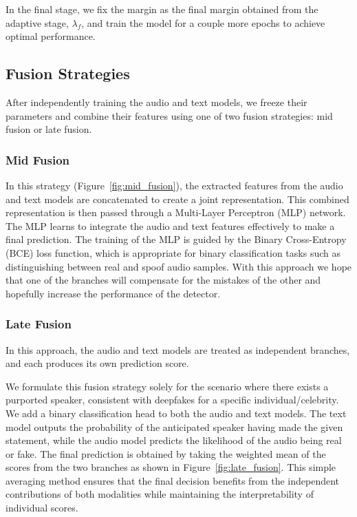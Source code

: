 \documentclass{Interspeech}
\begin{document}
In the final stage, we fix the margin as the final margin obtained from the
adaptive stage, $\lambda_{f}$, and train the model for a couple more epochs to
achieve optimal performance.

\subsection{Fusion Strategies}
After independently training the audio and text models, we freeze their
parameters and combine their features using one of two fusion strategies: mid
fusion or late fusion.

\subsubsection{Mid Fusion}
In this strategy (Figure~\ref{fig:mid_fusion}), the extracted features from the
audio and text models are concatenated to create a joint representation. This
combined representation is then passed through a Multi-Layer Perceptron (MLP)
network. The MLP learns to integrate the audio and text features effectively to
make a final prediction. The training of the MLP is guided by the Binary
Cross-Entropy (BCE) loss function, which is appropriate for binary
classification tasks such as distinguishing between real and spoof audio
samples. With this approach we hope that one of the branches will compensate
for the mistakes of the other and hopefully increase the performance of the
detector.

\subsubsection{Late Fusion}
In this approach, the audio and text models are treated as independent
branches, and each produces its own prediction score.

We formulate this fusion strategy solely for the scenario where there exists a
purported speaker, consistent with deepfakes for a specific
individual/celebrity. We add a binary classification head to both the audio and
text models. The text model outputs the probability of the anticipated speaker
having made the given statement, while the audio model predicts the likelihood
of the audio being real or fake. The final prediction is obtained by taking the
weighted mean of the scores from the two branches as shown in
Figure~\ref{fig:late_fusion}. This simple averaging method ensures that the
final decision benefits from the independent contributions of both modalities
while maintaining the interpretability of individual scores.
\end{document}
